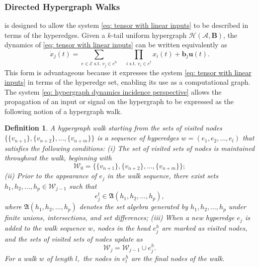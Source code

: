 \documentclass[journal,twoside,web]{ieeecolor}
\newtheorem{definition}{Definition}
\newcommand{\uv}{\mathbf{u}}
\begin{document}
\subsubsection{Directed Hypergraph Walks}\label{sec: directed hypergraphs}
%
 is designed to allow the system \eqref{eq: tensor with linear inputs} to be described in terms of the hyperedges.
%
Given a $k$-tail uniform hypergraph $\mathcal{H}(\mathscr{A},\textbf{B})$, the dynamics of \eqref{eq: tensor with linear inputs} can be written equivalently as
%
\begin{equation}\label{eq: hypergraph dynamics incidence perspective} 
    \dot{{x}}_j(t)=\sum_{e\in\mathcal{E}\text{ s.t. }v_j\in e^h}\quad\prod_{i\text{ s.t. }v_i\in e^t}{x}_i(t) +\textbf{b}_{j}\textbf{u}(t).
\end{equation}
%
This form is advantageous because it expresses the system \eqref{eq: tensor with linear inputs} in terms of the  hyperedge set, enabling its use as a computational graph.
%
The system \eqref{eq: hypergraph dynamics incidence perspective} allows the propagation of an input or signal on the hypergraph to be expressed as the following notion of a hypergraph walk.
\begin{definition}\label{def: walk} 
    A hypergraph walk starting from the sets of visited nodes $\{\{v_{n+1}\},\{v_{n+2}\},\dots,\{v_{n+m}\}\}$ is a sequence of hyperedges $w=(e_1,e_2,\dots,e_l)$ that satisfies the following conditions: 
    (i) The set of visited sets of nodes is maintained throughout the walk, beginning with         \[\mathcal{W}_0=\big\{\{v_{n+1}\},\{v_{n+2}\},\dots,\{v_{n+m}\}\big\};\] 
    (ii) Prior to the appearance of $e_j$ in the walk sequence, there exist sets 
    $h_1,h_2,\dots,h_p \in \mathcal{W}_{j-1}$ such that
    \[e_j^t \in \mathfrak{A}(h_1,h_2,\dots,h_p),\]
    where $\mathfrak{A}(h_1,h_2,\dots,h_p)$ denotes the set algebra generated by 
    $h_1,h_2,\dots,h_p$ under finite unions, intersections, and set differences;
       (iii) When a new hyperedge $e_j$ is added to the walk sequence $w$, nodes in the head $e_j^h$ are marked as visited nodes, and
       the sets of visited sets of nodes update as \[\mathcal{W}_j=\mathcal{W}_{j-1}\cup e_j^h.\]
    For a walk $w$ of length $l,$ the nodes in $e^h_l$ are the final nodes of the walk.
\end{definition}
\end{document}
